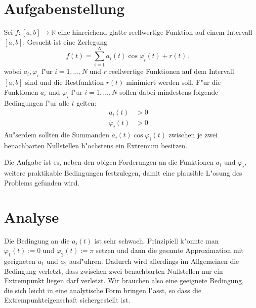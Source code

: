 \documentclass{scrartcl}
\newcommand{\R}{{\mathbb{R}}}
\begin{document}
\tableofcontents

\section{Aufgabenstellung}

Sei $f:[a,b]\to\R$ eine hinreichend glatte reellwertige Funktion auf einem Intervall $[a,b]$. Gesucht ist eine Zerlegung
$$ f(t) = \sum_{i=1}^N a_i(t)\cos\varphi_i(t) + r(t)\,, $$
wobei $a_i,\varphi_i$ f"ur $i=1,\dotsc,N$ und $r$ reellwertige Funktionen auf dem Intervall $[a,b]$ sind und die Restfunktion $r(t)$ minimiert werden soll. F"ur die Funktionen $a_i$ und $\varphi_i$ f"ur $i=1,\dotsc,N$ sollen dabei mindestens folgende Bedingungen f"ur alle $t$ gelten:
\begin{align*}
  a_i(t) &> 0 \\
  \dot{\varphi_i}(t) &> 0
\end{align*}
Au"serdem sollten die Summanden $a_i(t)\cos\varphi_i(t)$ zwischen je zwei benachbarten Nullstellen h"ochstens ein Extremum besitzen. 

Die Aufgabe ist es, neben den obigen Forderungen an die Funktionen $a_i$ und $\varphi_i$, weitere praktikable Bedingungen festzulegen, damit eine plausible L"osung des Problems gefunden wird. 


\section{Analyse}

Die Bedingung an die $a_i(t)$ ist sehr schwach. Prinzipiell k"onnte man $\varphi_1(t):=0$ und $\varphi_2(t):=\pi$ setzen und dann die gesamte Approximation mit geeigneten $a_1$ und $a_2$ ausf"uhren. Dadurch wird allerdings im Allgemeinen die Bedingung verletzt, dass zwischen zwei benachbarten Nullstellen nur ein Extrempunkt liegen darf verletzt. Wir brauchen also eine geeignete Bedingung, die sich leicht in eine analytische Form bringen l"asst, so dass die Extrempunkteigenschaft sichergestellt ist. 
\end{document}
